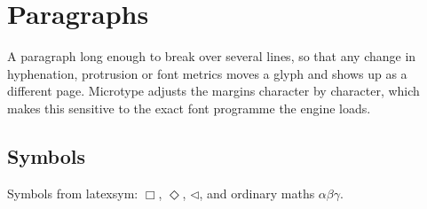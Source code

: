 \documentclass[11pt]{article}
\begin{document}
\section{Paragraphs}
A paragraph long enough to break over several lines, so that any change in
hyphenation, protrusion or font metrics moves a glyph and shows up as a
different page. Microtype adjusts the margins character by character, which
makes this sensitive to the exact font programme the engine loads.
\subsection{Symbols}
Symbols from latexsym: $\Box$, $\Diamond$, $\lhd$, and ordinary maths
$\alpha\beta\gamma$.
\end{document}
